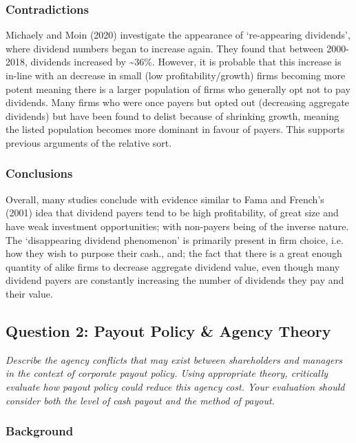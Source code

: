 \documentclass[11pt, english]{article}
\begin{document}
		\subsubsection*{Contradictions}

	Michaely and Moin (2020) investigate the appearance of `re-appearing dividends', where dividend numbers began to increase again. They found that between 2000- 2018, dividends increased by \~{}36\%. However, it is probable that this increase is in-line with an decrease in small (low profitability/growth) firms becoming more potent meaning there is a larger population of firms who generally opt not to pay dividends. Many firms who were once payers but opted out (decreasing aggregate dividends) but have been found to delist because of shrinking growth, meaning the listed population becomes more dominant in favour of payers. This supports previous arguments of the relative sort.

		\subsubsection*{Conclusions}

	Overall, many studies conclude with evidence similar to Fama and French's (2001) idea that dividend payers tend to be high profitability, of great size and have weak investment opportunities; with non-payers being of the inverse nature. The `disappearing dividend phenomenon' is primarily present in firm choice, i.e. how they wish to purpose their cash., and; the fact that there is a great enough quantity of alike firms to decrease aggregate dividend value, even though many dividend payers are constantly increasing the number of dividends they pay and their value.

	\newpage

	\subsection{Question 2: Payout Policy \& Agency Theory}

	\textit{Describe the agency conflicts that may exist between shareholders and managers in the context of corporate payout policy. Using appropriate theory, critically evaluate how payout policy could reduce this agency cost. Your evaluation should consider both the level of cash payout and the method of payout.}

		\subsubsection*{Background}
\end{document}
